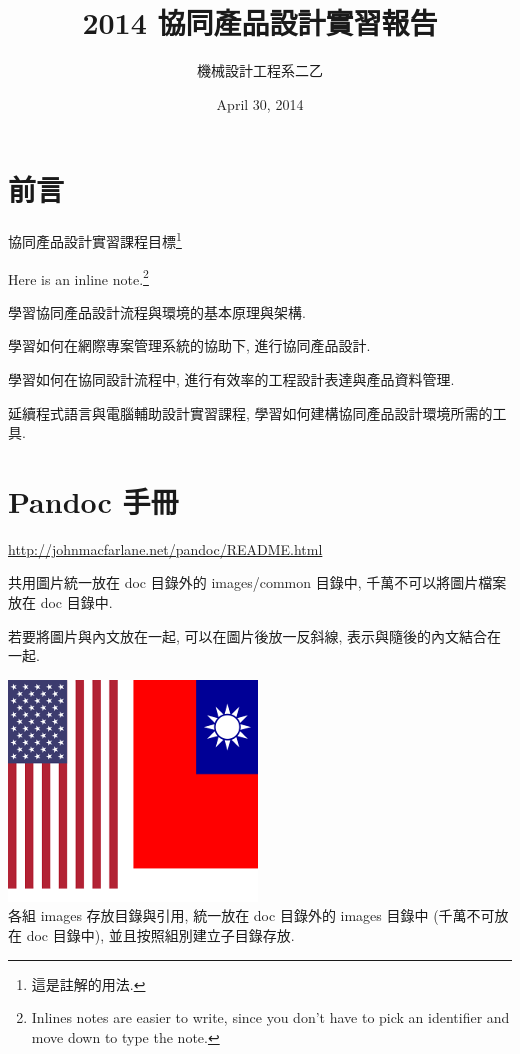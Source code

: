 \documentclass[]{article}
\title{2014 協同產品設計實習報告}
\author{機械設計工程系二乙}
\date{April 30, 2014}
\begin{document}
\maketitle

{
\hypersetup{linkcolor=black}
\setcounter{tocdepth}{3}
\tableofcontents
}
\section{前言}\label{ux524dux8a00}

協同產品設計實習課程目標\footnote{這是註解的用法.}

Here is an inline note.\footnote{Inlines notes are easier to write,
  since you don't have to pick an identifier and move down to type the
  note.}

學習協同產品設計流程與環境的基本原理與架構.

學習如何在網際專案管理系統的協助下, 進行協同產品設計.

學習如何在協同設計流程中, 進行有效率的工程設計表達與產品資料管理.

延續程式語言與電腦輔助設計實習課程,
學習如何建構協同產品設計環境所需的工具.

\section{Pandoc 手冊}\label{pandoc-ux624bux518a}

\url{http://johnmacfarlane.net/pandoc/README.html}

共用圖片統一放在 doc 目錄外的 images/common 目錄中,
千萬不可以將圖片檔案放在 doc 目錄中.

若要將圖片與內文放在一起, 可以在圖片後放一反斜線,
表示與隨後的內文結合在一起.

\includegraphics{./../images/common/c2_w14_task2.png}\\ 各組 images
存放目錄與引用, 統一放在 doc 目錄外的 images 目錄中 (千萬不可放在 doc
目錄中), 並且按照組別建立子目錄存放.
\end{document}
